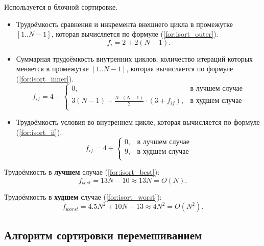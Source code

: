 Используется в блочной сортировке. 

\begin{itemize}
	\item Трудоёмкость сравнения и инкремента внешнего цикла в промежутке $[1..N-1]$, которая вычисляется по формуле (\ref{for:isort_outer}).
	\begin{equation}
	\label{for:isort_outer}
	f_{i} = 2 + 2(N - 1).
	\end{equation}
	\item Суммарная трудоёмкость внутренних циклов, количество итераций которых меняется в промежутке $[1..N-1]$, которая вычисляется по формуле (\ref{for:isort_inner}).
	\begin{equation}
	\label{for:isort_inner}
	f_{if} = 4 + \begin{cases}
		0, & \text{в лучшем случае}\\
		3(N - 1) + \frac{N \cdot (N - 1)}{2} \cdot (3 + f_{if}), & \text{в худшем случае}\\
	\end{cases}
	\end{equation}

	\item Трудоёмкость условия во внутреннем цикле, которая вычисляется по формуле (\ref{for:isort_if}).
	\begin{equation}
	\label{for:isort_if}
	f_{if} = 4 + \begin{cases}
	0, & \text{в лучшем случае}\\
	9, & \text{в худшем случае}\\
	\end{cases}
	\end{equation}
\end{itemize}

Трудоёмкость в \textbf{лучшем} случае (\ref{for:isort_best}):
\begin{equation}
\label{for:isort_best}
f_{best} = 13N - 10 \approx 13N = O(N).
\end{equation}

Трудоёмкость в \textbf{худшем} случае (\ref{for:isort_worst}):
\begin{equation}
\label{for:isort_worst}
f_{worst} = 4.5N^2 + 10N - 13 \approx 4N^2 = O(N^{2}).
\end{equation}

\subsection{Алгоритм сортировки перемешиванием}


